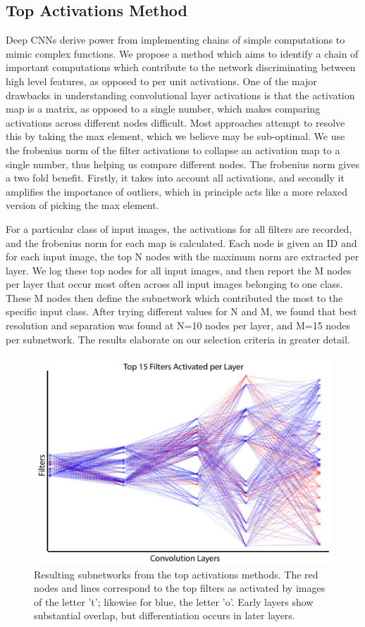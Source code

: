 \documentclass[10pt,twocolumn,letterpaper]{article}
\begin{document}
\subsection{Top Activations Method}
Deep CNNs derive power from implementing chains of simple computations to mimic complex functions. We propose a method which aims to identify a chain of important computations which contribute to the network discriminating between high level features, as opposed to per unit activations. One of the major drawbacks in understanding convolutional layer activations is that the activation map is a matrix, as opposed to a single number, which makes comparing activations across different nodes difficult. Most approaches attempt to resolve this by taking the max element, which we believe may be sub-optimal. We use the frobenius norm of the filter activations to collapse an activation map to a single number, thus helping us compare different nodes. The frobenius norm gives a two fold benefit. Firstly, it takes into account all activations, and secondly it amplifies the importance of outliers, which in principle acts like a more relaxed version of picking the max element. 

For a particular class of input images, the activations for all filters are recorded, and the frobenius norm for each map is calculated. Each node is given an ID and for each input image, the top N nodes with the maximum norm are extracted per layer. We log these top nodes for all input images, and then report the M nodes per layer that occur most often across all input images belonging to one class. These M nodes then define the subnetwork which contributed the most to the specific input class. After trying different values for N and M, we found that best resolution and separation was found at N=10 nodes per layer, and M=15 nodes per subnetwork. The results elaborate on our selection criteria in greater detail.

\begin{figure}
\includegraphics[width=\columnwidth]{Figures/max_activations/max_activations-01.png}
\caption{Resulting subnetworks from the top activations methods. The red nodes and lines correspond to the top filters as activated by images of the letter 't'; likewise for blue, the letter 'o'. Early layers show substantial overlap, but differentiation occurs in later layers.}
\label{fig:activationgraph}
\end{figure}
\end{document}
